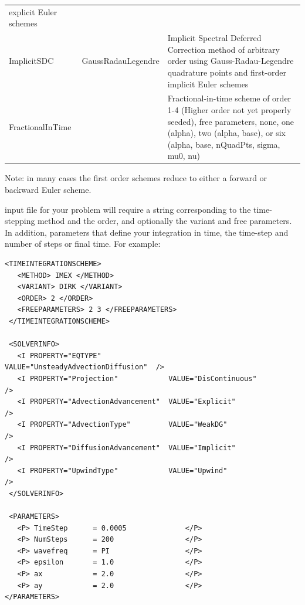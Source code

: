 \begin{center}
\begin{tabular}{p{2.5cm}p{4cm}p{8cm}}
                                   explicit Euler schemes\\
ImplicitSDC & GaussRadauLegendre & Implicit Spectral Deferred Correction method of arbitrary order
                                   using Gauss-Radau-Legendre quadrature points and first-order
                                   implicit Euler schemes\\
FractionalInTime &            & Fractional-in-time scheme of order 1-4
                              (Higher order not yet properly seeded),
                              free parameters, none,
                              one (alpha),
                              two (alpha, base), or
                              six (alpha, base, nQuadPts, sigma, mu0, nu) \\
                    
\bottomrule
\end{tabular}
\end{center}

Note: in many cases the first order schemes reduce to either a forward
or backward Euler scheme.

{\nek} input file for your problem will require a string corresponding
to the time-stepping method and the order, and optionally the variant and
free parameters. In addition, parameters that define your integration
in time, the time-step and number of steps or final time. For
example:\\
\begin{lstlisting}[style=XMLStyle]
 <TIMEINTEGRATIONSCHEME>
   <METHOD> IMEX </METHOD>
   <VARIANT> DIRK </VARIANT>
   <ORDER> 2 </ORDER>
   <FREEPARAMETERS> 2 3 </FREEPARAMETERS>
 </TIMEINTEGRATIONSCHEME>

 <SOLVERINFO>
   <I PROPERTY="EQTYPE"                VALUE="UnsteadyAdvectionDiffusion"  />
   <I PROPERTY="Projection"            VALUE="DisContinuous"               />
   <I PROPERTY="AdvectionAdvancement"  VALUE="Explicit"                    />
   <I PROPERTY="AdvectionType"         VALUE="WeakDG"                      />
   <I PROPERTY="DiffusionAdvancement"  VALUE="Implicit"                    />
   <I PROPERTY="UpwindType"            VALUE="Upwind"                      />
 </SOLVERINFO>
 
 <PARAMETERS>
   <P> TimeStep      = 0.0005              </P>
   <P> NumSteps      = 200                 </P>
   <P> wavefreq      = PI                  </P>
   <P> epsilon       = 1.0                 </P>
   <P> ax            = 2.0                 </P>
   <P> ay            = 2.0                 </P>
</PARAMETERS>
\end{lstlisting}

